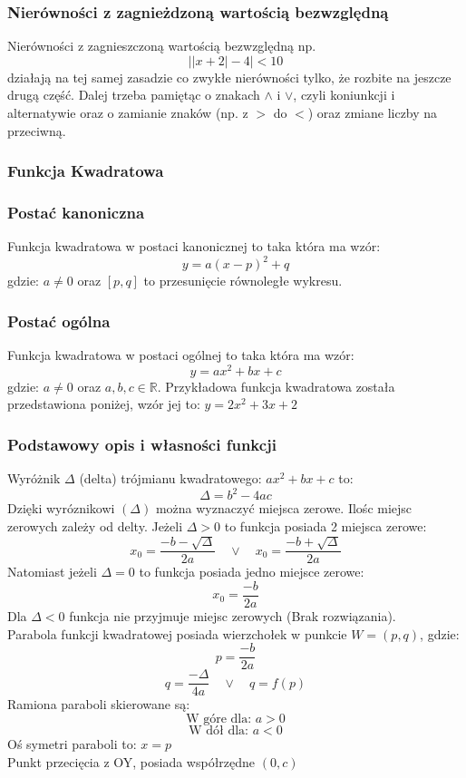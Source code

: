 \documentclass[12pt, a4paper]{article}
\begin{document}
\subsubsection*{Nierówności z zagnieżdzoną wartością bezwzględną}
Nierówności z zagnieszczoną wartością bezwzględną np. $$\left|\left|x+2\right|-4\right|<10$$ działają na tej samej zasadzie co
zwykłe nierówności tylko, że rozbite na jeszcze drugą część. Dalej trzeba pamiętąc o znakach $\wedge$ i $\vee$, czyli koniunkcji i alternatywie
oraz o zamianie znaków (np. z $>$ do $<$) oraz zmiane liczby na przeciwną.

\subsubsection{Funkcja Kwadratowa}

\subsubsection*{Postać kanoniczna}
Funkcja kwadratowa w postaci kanonicznej to taka która ma wzór:
$$y = a(x - p)^2 + q$$
gdzie: $a \neq 0$ oraz $[p, q]$ to przesunięcie równoległe wykresu.

\subsubsection*{Postać ogólna}
Funkcja kwadratowa w postaci ogólnej to taka która ma wzór:
$$y = ax^2 + bx + c$$
gdzie: $a \neq 0$ oraz $a, b, c \in \mathbb{R}$. Przykładowa funkcja kwadratowa została przedstawiona
poniżej, wzór jej to: $y = 2x^2 + 3x + 2$
\begin{center}
\end{center}
\subsubsection*{Podstawowy opis i własności funkcji}
Wyróżnik $\Delta$ (delta) trójmianu kwadratowego: $ax^2 + bx + c$ to:
$$\Delta = b^2 - 4ac$$
Dzięki wyróznikowi $(\Delta)$ można wyznaczyć miejsca zerowe. Ilośc miejsc zerowych zależy od delty.
Jeżeli $\Delta > 0$ to funkcja posiada 2 miejsca zerowe:
$$x_0 = \frac{-b - \sqrt{\Delta}}{2a}\quad\vee\quad x_0=\frac{-b + \sqrt{\Delta}}{2a}$$
Natomiast jeżeli $\Delta = 0$ to funkcja posiada jedno miejsce zerowe:
$$x_0 = \frac{-b}{2a}$$
Dla $\Delta < 0$ funkcja nie przyjmuje miejsc zerowych (Brak rozwiązania). \\
Parabola funkcji kwadratowej posiada wierzchołek w punkcie $W=(p, q)$, gdzie:
$$p = \frac{-b}{2a}$$
$$q = \frac{-\Delta}{4a}\quad\vee\quad q = f(p)$$
Ramiona paraboli skierowane są:
$$\text{W góre dla: } a > 0$$
$$\text{W dół dla: } a < 0$$
Oś symetri paraboli to: $x = p$ \\
Punkt przecięcia z OY, posiada współrzędne $\left(0, c\right)$
\end{document}
